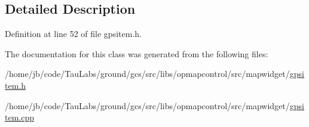 \subsection{\-Detailed \-Description}


\-Definition at line 52 of file gpsitem.\-h.



\-The documentation for this class was generated from the following files\-:\begin{DoxyCompactItemize}
\item 
/home/jb/code/\-Tau\-Labs/ground/gcs/src/libs/opmapcontrol/src/mapwidget/\hyperlink{gpsitem_8h}{gpsitem.\-h}\item 
/home/jb/code/\-Tau\-Labs/ground/gcs/src/libs/opmapcontrol/src/mapwidget/\hyperlink{gpsitem_8cpp}{gpsitem.\-cpp}\end{DoxyCompactItemize}
